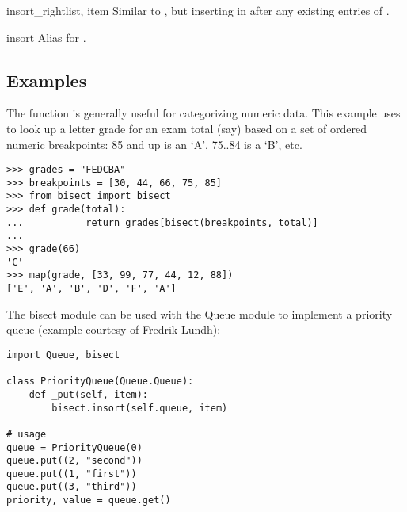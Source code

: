 \begin{funcdesc}{insort_right}{list, item}
  Similar to , but inserting  in
   after any existing entries of .
\end{funcdesc}

\begin{funcdesc}{insort}{\unspecified}
  Alias for .
\end{funcdesc}


\subsection{Examples}

The  function is generally useful for categorizing
numeric data.  This example uses  to look up a
letter grade for an exam total (say) based on a set of ordered numeric
breakpoints: 85 and up is an `A', 75..84 is a `B', etc.

\begin{verbatim}
>>> grades = "FEDCBA"
>>> breakpoints = [30, 44, 66, 75, 85]
>>> from bisect import bisect
>>> def grade(total):
...           return grades[bisect(breakpoints, total)]
...
>>> grade(66)
'C'
>>> map(grade, [33, 99, 77, 44, 12, 88])
['E', 'A', 'B', 'D', 'F', 'A']
\end{verbatim}

The bisect module can be used with the Queue module to implement a priority
queue (example courtesy of Fredrik Lundh): 

\begin{verbatim}
import Queue, bisect

class PriorityQueue(Queue.Queue):
    def _put(self, item):
        bisect.insort(self.queue, item)

# usage
queue = PriorityQueue(0)
queue.put((2, "second"))
queue.put((1, "first"))
queue.put((3, "third"))
priority, value = queue.get()
\end{verbatim}
